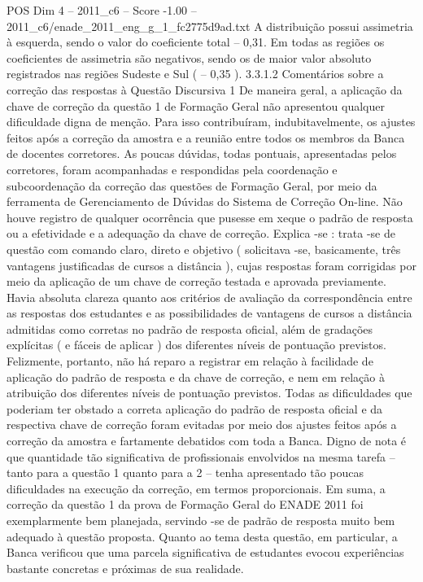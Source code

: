 \begin{textsample}{POS Dim 4 – 2011\_c6 – Score -1.00 – 2011\_c6/enade\_2011\_eng\_g\_1\_fc2775d9ad.txt}
A distribuição possui assimetria à esquerda, sendo o valor do coeficiente total – 0,31.
Em todas as regiões os coeficientes de assimetria são negativos, sendo os de maior valor absoluto registrados nas regiões Sudeste e Sul ( – 0,35 ). 3.3.1.2 Comentários sobre a correção das respostas à Questão Discursiva 1 De maneira geral, a aplicação da chave de correção da questão 1 de Formação Geral não apresentou qualquer dificuldade digna de menção.
Para isso contribuíram, indubitavelmente, os ajustes feitos após a correção da amostra e a reunião entre todos os membros da Banca de docentes corretores.
As poucas dúvidas, todas pontuais, apresentadas pelos corretores, foram acompanhadas e respondidas pela coordenação e subcoordenação da correção das questões de Formação Geral, por meio da ferramenta de Gerenciamento de Dúvidas do Sistema de Correção On-line.
Não houve registro de qualquer ocorrência que pusesse em xeque o padrão de resposta ou a efetividade e a adequação da chave de correção.
Explica -se : trata -se de questão com comando claro, direto e objetivo ( solicitava -se, basicamente, três vantagens justificadas de cursos a distância ), cujas respostas foram corrigidas por meio da aplicação de um chave de correção testada e aprovada previamente.
Havia absoluta clareza quanto aos critérios de avaliação da correspondência entre as respostas dos estudantes e as possibilidades de vantagens de cursos a distância admitidas como corretas no padrão de resposta oficial, além de gradações explícitas ( e fáceis de aplicar ) dos diferentes níveis de pontuação previstos.
Felizmente, portanto, não há reparo a registrar em relação à facilidade de aplicação do padrão de resposta e da chave de correção, e nem em relação à atribuição dos diferentes níveis de pontuação previstos.
Todas as dificuldades que poderiam ter obstado a correta aplicação do padrão de resposta oficial e da respectiva chave de correção foram evitadas por meio dos ajustes feitos após a correção da amostra e fartamente debatidos com toda a Banca.
Digno de nota é que quantidade tão significativa de profissionais envolvidos na mesma tarefa – tanto para a questão 1 quanto para a 2 – tenha apresentado tão poucas dificuldades na execução da correção, em termos proporcionais.
Em suma, a correção da questão 1 da prova de Formação Geral do ENADE 2011 foi exemplarmente bem planejada, servindo -se de padrão de resposta muito bem adequado à questão proposta.
Quanto ao tema desta questão, em particular, a Banca verificou que uma parcela significativa de estudantes evocou experiências bastante concretas e próximas de sua realidade.

\end{textsample}
